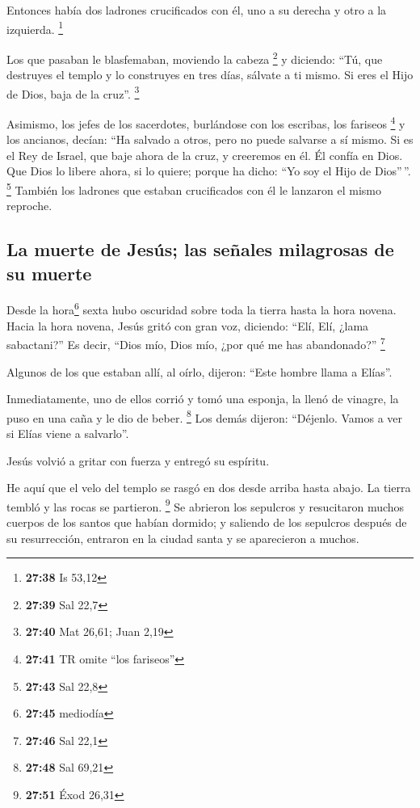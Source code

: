  Entonces había dos ladrones crucificados con él, uno a
su derecha y otro a la izquierda. \footnote{\textbf{27:38} Is 53,12}

 Los que pasaban le blasfemaban, moviendo la cabeza
\footnote{\textbf{27:39} Sal 22,7}  y diciendo: ``Tú, que
destruyes el templo y lo construyes en tres días, sálvate a ti mismo. Si
eres el Hijo de Dios, baja de la cruz''. \footnote{\textbf{27:40} Mat
  26,61; Juan 2,19}

 Asimismo, los jefes de los sacerdotes, burlándose con
los escribas, los fariseos \footnote{\textbf{27:41} TR omite ``los
  fariseos''} y los ancianos, decían:  ``Ha salvado a
otros, pero no puede salvarse a sí mismo. Si es el Rey de Israel, que
baje ahora de la cruz, y creeremos en él.  Él confía en
Dios. Que Dios lo libere ahora, si lo quiere; porque ha dicho: ``Yo soy
el Hijo de Dios''\,''. \footnote{\textbf{27:43} Sal 22,8}
 También los ladrones que estaban crucificados con él le
lanzaron el mismo reproche.

\hypertarget{la-muerte-de-jesuxfas-las-seuxf1ales-milagrosas-de-su-muerte}{%
\subsection{La muerte de Jesús; las señales milagrosas de su
muerte}\label{la-muerte-de-jesuxfas-las-seuxf1ales-milagrosas-de-su-muerte}}

 Desde la hora\footnote{\textbf{27:45} mediodía} sexta
hubo oscuridad sobre toda la tierra hasta la hora novena.
 Hacia la hora novena, Jesús gritó con gran voz,
diciendo: ``Elí, Elí, ¿lama sabactani?'' Es decir, ``Dios mío, Dios mío,
¿por qué me has abandonado?'' \footnote{\textbf{27:46} Sal 22,1}

 Algunos de los que estaban allí, al oírlo, dijeron:
``Este hombre llama a Elías''.

 Inmediatamente, uno de ellos corrió y tomó una esponja,
la llenó de vinagre, la puso en una caña y le dio de beber. \footnote{\textbf{27:48}
  Sal 69,21}  Los demás dijeron: ``Déjenlo. Vamos a ver
si Elías viene a salvarlo''.

 Jesús volvió a gritar con fuerza y entregó su espíritu.

 He aquí que el velo del templo se rasgó en dos desde
arriba hasta abajo. La tierra tembló y las rocas se partieron.
\footnote{\textbf{27:51} Éxod 26,31}  Se abrieron los
sepulcros y resucitaron muchos cuerpos de los santos que habían dormido;
 y saliendo de los sepulcros después de su resurrección,
entraron en la ciudad santa y se aparecieron a muchos.

